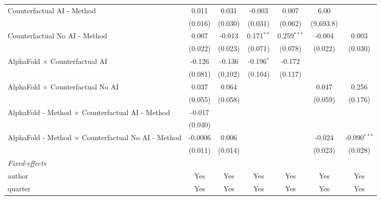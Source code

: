 \begin{tabular}{lcccccc}
   Counterfactual AI - Method                                 & 0.011   & 0.031   & -0.003         & 0.007         & 6.00         &   \\   
                                                              & (0.016) & (0.030) & (0.031)        & (0.062)       & (9,693.8)    &   \\   
   Counterfactual No AI - Method                              & 0.007   & -0.013  & 0.171$^{**}$   & 0.259$^{***}$ & -0.004       & 0.003\\   
                                                              & (0.022) & (0.023) & (0.071)        & (0.078)       & (0.022)      & (0.030)\\   
   AlphaFold $\times$ Counterfactual AI                       & -0.126  & -0.136  & -0.196$^{*}$   & -0.172        &              &   \\   
                                                              & (0.081) & (0.102) & (0.104)        & (0.117)       &              &   \\   
   AlphaFold $\times$ Counterfactual No AI                    & 0.037   & 0.064   &                &               & 0.047        & 0.256\\   
                                                              & (0.055) & (0.058) &                &               & (0.059)      & (0.176)\\   
   AlphaFold - Method $\times$ Counterfactual AI - Method     & -0.017  &         &                &               &              &   \\   
                                                              & (0.040) &         &                &               &              &   \\   
   AlphaFold - Method $\times$ Counterfactual No AI - Method  & -0.0006 & 0.006   &                &               & -0.024       & -0.090$^{***}$\\   
                                                              & (0.011) & (0.014) &                &               & (0.023)      & (0.028)\\   
   \midrule
   \emph{Fixed-effects}\\
   author                                                     & Yes     & Yes     & Yes            & Yes           & Yes          & Yes\\  
   quarter                                                    & Yes     & Yes     & Yes            & Yes           & Yes          & Yes\\  

\end{tabular}
